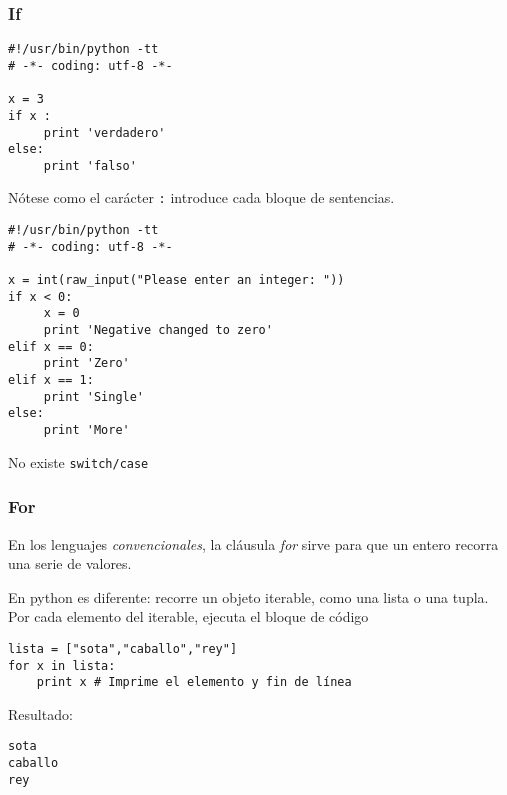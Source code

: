 \documentclass[ucs]{beamer}
\begin{document}

\begin{frame}[fragile]
\frametitle{If}

\begin{scriptsize}
\begin{verbatim}
#!/usr/bin/python -tt
# -*- coding: utf-8 -*-

x = 3
if x :
     print 'verdadero'
else:
     print 'falso'
\end{verbatim}
\end{scriptsize}
Nótese como el carácter \verb|:| introduce cada bloque de sentencias.
\end{frame}


\begin{frame}[fragile]
\begin{scriptsize}
\begin{verbatim}
#!/usr/bin/python -tt
# -*- coding: utf-8 -*-

x = int(raw_input("Please enter an integer: "))
if x < 0:
     x = 0
     print 'Negative changed to zero'
elif x == 0:
     print 'Zero'
elif x == 1:
     print 'Single'
else:
     print 'More'
\end{verbatim}
\end{scriptsize}
  

No existe \verb|switch/case|
\end{frame}



\begin{frame}[fragile]

\frametitle{For}

En los lenguajes \emph{convencionales}, la cláusula \emph{for}
sirve para que un entero recorra una serie de valores.

En python es diferente:
recorre un objeto iterable, como una lista o una tupla. Por cada elemento del iterable,
ejecuta el bloque de código 


\begin{scriptsize}
\begin{verbatim}
lista = ["sota","caballo","rey"]
for x in lista:
    print x # Imprime el elemento y fin de línea
\end{verbatim}
\end{scriptsize}
Resultado:

\begin{scriptsize}
\begin{verbatim}
sota
caballo
rey
\end{verbatim}
\end{scriptsize}



\end{frame}
\end{document}
